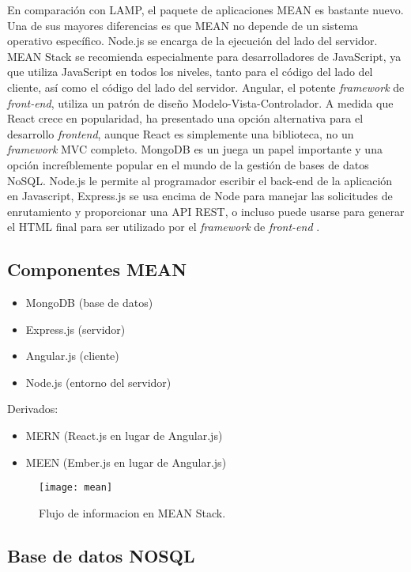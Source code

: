 En comparación con LAMP, el paquete de aplicaciones MEAN es bastante nuevo. Una de sus mayores diferencias es que MEAN no depende de un sistema operativo específico. Node.js se encarga de la ejecución del lado del servidor. MEAN Stack se recomienda especialmente para desarrolladores de JavaScript, ya que utiliza JavaScript en todos los niveles, tanto para el código del lado del cliente, así como el código del lado del servidor. Angular, el potente \textit{framework} de \textit{front-end}, utiliza un patrón de diseño Modelo-Vista-Controlador. A medida que React crece en popularidad, ha presentado una opción alternativa para el desarrollo \textit{frontend}, aunque React es simplemente una biblioteca, no un \textit{framework} MVC completo. MongoDB es un juega un papel importante y una opción increíblemente popular en el mundo de la gestión de bases de datos NoSQL. Node.js le permite al programador escribir el back-end de la aplicación en Javascript, Express.js se usa encima de Node para manejar las solicitudes de enrutamiento y proporcionar una API REST, o incluso puede usarse para generar el HTML final para ser utilizado por el \textit{framework} de \textit{front-end} \cite{srinivasan}.

\subsection{Componentes MEAN}
\begin{itemize}
  \item MongoDB (base de datos)
  \item Express.js (servidor)
  \item Angular.js (cliente)
  \item Node.js (entorno del servidor)
\end{itemize}

Derivados:

\begin{itemize}
  \item MERN (React.js en lugar de Angular.js)
  \item MEEN (Ember.js en lugar de Angular.js)
\end{itemize}

\begin{figure}[H]
  \centering
  \texttt{[image: mean]}
  \caption{Flujo de informacion en MEAN Stack.}
\end{figure}

\subsection{Base de datos NOSQL}


